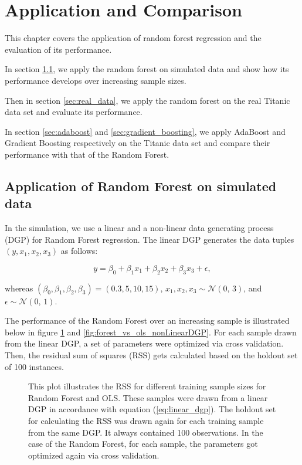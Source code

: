 \section{Application and Comparison}
This chapter covers the application of random forest regression and the evaluation of its performance.

In section \ref{sec:simulation}, we apply the random forest on simulated data
and show how its performance develops over increasing sample sizes.

Then in section \ref{sec:real_data}, we apply the random forest on the real Titanic data set \cite{titanicData}
and evaluate its performance.

In section \ref{sec:adaboost} and \ref{sec:gradient_boosting}, we apply AdaBoost and Gradient
Boosting respectively on the Titanic data set and compare their performance with that of the Random Forest.

\subsection{Application of Random Forest on simulated data}
\label{sec:simulation}

In the simulation, we use a linear and a non-linear data generating process (DGP) for Random Forest regression.
The linear DGP generates the data tuples \( (y, x_{1}, x_{2}, x_{3}) \) as follows:

\begin{equation}\label{eq:linear_dgp}
    y = \beta_{0} + \beta_{1} x_{1} + \beta_{2} x_{2} + \beta_{3} x_{3} + \epsilon,
\end{equation}

whereas \( (\beta_{0}, \beta_{1}, \beta_{2}, \beta_{3}) = (0.3, 5, 10, 15) \),
\( x_{1}, x_{2}, x_{3} \sim \mathcal{N}(0,\,3) \), and \( \epsilon \sim \mathcal{N}(0,\,1) \).

The performance of the Random Forest over an increasing sample is illustrated
below in figure \ref{fig:forest_vs_ols_linearDGP} and \ref{fig:forest_vs_ols_nonLinearDGP}.
For each sample drawn from the linear DGP, a set of parameters
were optimized via cross validation. Then, the residual sum of squares (RSS) gets calculated
based on the holdout set of 100 instances.

\begin{figure}[H]
    \captionsetup{format=plain}
    \caption
        {This plot illustrates the RSS for different training sample sizes for Random Forest and OLS.
        These samples were drawn from a linear DGP in accordance with equation (\ref{eq:linear_dgp}).
        The holdout set for calculating the RSS was drawn again for each training sample from the same DGP.
        It always contained 100 observations. In the case of the Random Forest, for each sample, the parameters
        got optimized again via cross validation.
        }
    \label{fig:forest_vs_ols_linearDGP}
\end{figure}

